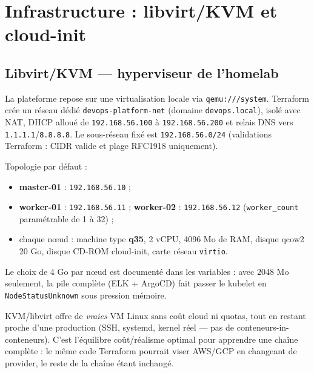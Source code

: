 \documentclass[11pt,a4paper]{article}
\begin{document}
\clearpage

\section{Infrastructure : libvirt/KVM et cloud-init}

\subsection{Libvirt/KVM --- hyperviseur de l'homelab}
La plateforme repose sur une virtualisation locale via \texttt{qemu:///system}. Terraform crée un réseau dédié \texttt{devops-platform-net} (domaine \texttt{devops.local}), isolé avec NAT, DHCP alloué de \texttt{192.168.56.100} à \texttt{192.168.56.200} et relais DNS vers \texttt{1.1.1.1}/\texttt{8.8.8.8}. Le sous-réseau fixé est \texttt{192.168.56.0/24} (validations Terraform : CIDR valide et plage RFC1918 uniquement).

Topologie par défaut :
\begin{itemize}[itemsep=1pt]
  \item \textbf{master-01} : \texttt{192.168.56.10} ;
  \item \textbf{worker-01} : \texttt{192.168.56.11} ; \textbf{worker-02} : \texttt{192.168.56.12} (\texttt{worker\_count} paramétrable de 1 à 32) ;
  \item chaque nœud : machine type \textbf{q35}, 2 vCPU, 4096 Mo de RAM, disque qcow2 20 Go, disque CD-ROM cloud-init, carte réseau \texttt{virtio}.
\end{itemize}

Le choix de 4 Go par nœud est documenté dans les variables : avec 2048 Mo seulement, la pile complète (ELK + ArgoCD) fait passer le kubelet en \texttt{NodeStatusUnknown} sous pression mémoire.

\begin{whybox}
KVM/libvirt offre de \emph{vraies} VM Linux sans coût cloud ni quotas, tout en restant proche d'une production (SSH, systemd, kernel réel --- pas de conteneurs-in-conteneurs). C'est l'équilibre coût/réalisme optimal pour apprendre une chaîne complète : le même code Terraform pourrait viser AWS/GCP en changeant de provider, le reste de la chaîne étant inchangé.
\end{whybox}
\end{document}
